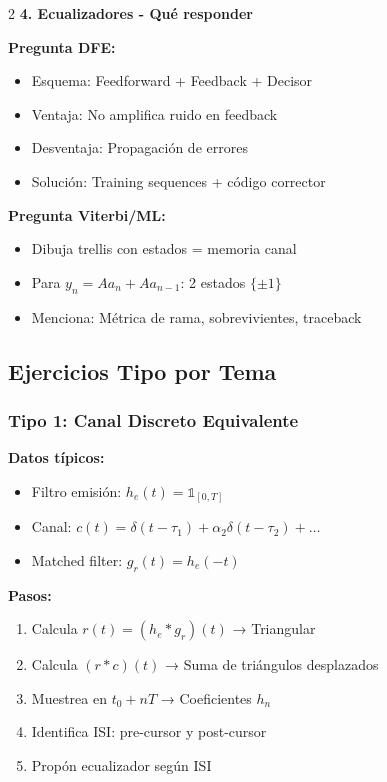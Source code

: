 \documentclass[10pt,a4paper]{article}
\begin{document}
\begin{multicols}{2}
\textbf{4. Ecualizadores - Qué responder}

\textbf{Pregunta DFE:}
\begin{itemize}
\item Esquema: Feedforward + Feedback + Decisor
\item Ventaja: No amplifica ruido en feedback
\item Desventaja: Propagación de errores
\item Solución: Training sequences + código corrector
\end{itemize}

\textbf{Pregunta Viterbi/ML:}
\begin{itemize}
\item Dibuja trellis con estados = memoria canal
\item Para $y_n = Aa_n + Aa_{n-1}$: 2 estados $\{\pm 1\}$
\item Menciona: Métrica de rama, sobrevivientes, traceback
\end{itemize}

\subsection{Ejercicios Tipo por Tema}

\subsubsection{Tipo 1: Canal Discreto Equivalente}

\textbf{Datos típicos:}
\begin{itemize}
\item Filtro emisión: $h_e(t) = \mathds{1}_{[0,T]}$
\item Canal: $c(t) = \delta(t-\tau_1) + \alpha_2\delta(t-\tau_2) + \ldots$
\item Matched filter: $g_r(t) = h_e(-t)$
\end{itemize}

\textbf{Pasos:}
\begin{enumerate}
\item Calcula $r(t) = (h_e * g_r)(t)$ → Triangular
\item Calcula $(r * c)(t)$ → Suma de triángulos desplazados
\item Muestrea en $t_0 + nT$ → Coeficientes $h_n$
\item Identifica ISI: pre-cursor y post-cursor
\item Propón ecualizador según ISI
\end{enumerate}


\end{multicols}
\end{document}
